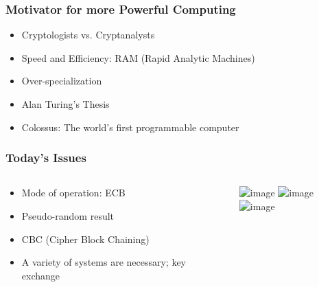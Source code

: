 \documentclass[12pt]{beamer}
\begin{document}
\begin{frame}
\frametitle{Motivator for more Powerful Computing}
\begin{itemize}
\item<2-> Cryptologists vs. Cryptanalysts
\item<3-> Speed and Efficiency: RAM (Rapid Analytic Machines)
\item<4-> Over-specialization
\item<5-> Alan Turing's Thesis
\item<6-> Colossus: The world's first programmable computer
\end{itemize}
\begin{center}
\end{center}
\end{frame}

\begin{frame}
\frametitle{Today's Issues}

\begin{columns}
\begin{column}{0.5\textwidth}
\begin{itemize}
\item<1-> Mode of operation: ECB
\item<3-> Pseudo-random result
\item<4-> CBC (Cipher Block Chaining)
\item<4-> A variety of systems are necessary; key exchange
\end{itemize}
\end{column}
\begin{column}{0.5\textwidth}
\includegraphics<1>[scale=0.7]{tux.jpg}
\includegraphics<2>[scale=0.7]{tux_ecb.jpg}
\includegraphics<3->[scale=0.7]{tux_secure.jpg}
\break
{}
\end{column}
\end{columns}
\end{frame}
\end{document}
